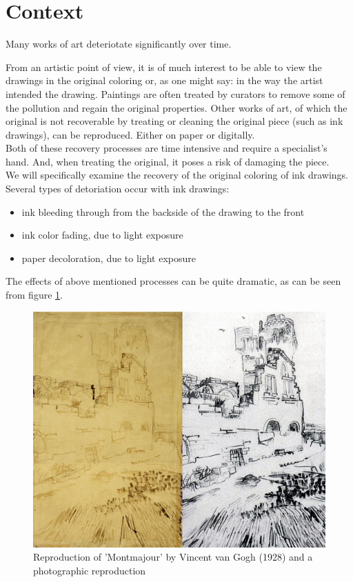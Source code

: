 \section{Context}

	Many works of art deteriotate significantly over time.

	From an artistic point of view, it is of much interest to be able to view the drawings
	in the original coloring or, as one might say: in the way the artist intended the drawing.
	Paintings are often treated by curators to remove some of the pollution and regain
	the original properties.  Other works of art, of which the original is not recoverable by
	treating or cleaning the original piece (such as ink drawings), can be reproduced.
	Either on paper or digitally. \\

	Both of these recovery processes are time intensive and require a specialist's hand.
	And, when treating the original, it poses a risk of damaging the piece. \\

	We will specifically examine the recovery of the original coloring of ink drawings.
	Several types of detoriation occur with ink drawings:

	\begin{itemize}
		\item ink bleeding through from the backside of the drawing to the front
		\item ink color fading, due to light exposure
		\item paper decoloration, due to light exposure
	\end{itemize}

	The effects of above mentioned processes can be quite dramatic, as can be seen from
	figure \ref{montmajour}.

	\begin{figure}[h!]
		\label{montmajour}
		\includegraphics[width=\columnwidth]{graphics/montmajour}
		\caption{Reproduction of 'Montmajour' by Vincent van Gogh (1928) and a photographic reproduction}
	\end{figure}

